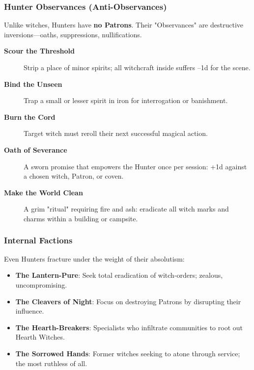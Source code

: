 \documentclass[11pt]{book}
\begin{document}
\subsubsection{Hunter Observances (Anti-Observances)}
Unlike witches, Hunters have \textbf{no Patrons}.  
Their "Observances" are destructive inversions---oaths, suppressions, nullifications.

\begin{description}
    \item[\textbf{Scour the Threshold}]  
    Strip a place of minor spirits; all witchcraft inside suffers --1d for the scene.

    \item[\textbf{Bind the Unseen}]  
    Trap a small or lesser spirit in iron for interrogation or banishment.

    \item[\textbf{Burn the Cord}]  
    Target witch must reroll their next successful magical action.

    \item[\textbf{Oath of Severance}]  
    A sworn promise that empowers the Hunter once per session: +1d against a chosen witch, Patron, or coven.

    \item[\textbf{Make the World Clean}]  
    A grim "ritual" requiring fire and ash: eradicate all witch marks and charms within a building or campsite.
\end{description}

\subsubsection{Internal Factions}
Even Hunters fracture under the weight of their absolutism:

\begin{itemize}
    \item \textbf{The Lantern-Pure}:  
    Seek total eradication of witch-orders; zealous, uncompromising.

    \item \textbf{The Cleavers of Night}:  
    Focus on destroying Patrons by disrupting their influence.

    \item \textbf{The Hearth-Breakers}:  
    Specialists who infiltrate communities to root out Hearth Witches.

    \item \textbf{The Sorrowed Hands}:  
    Former witches seeking to atone through service; the most ruthless of all.
\end{itemize}
\end{document}
